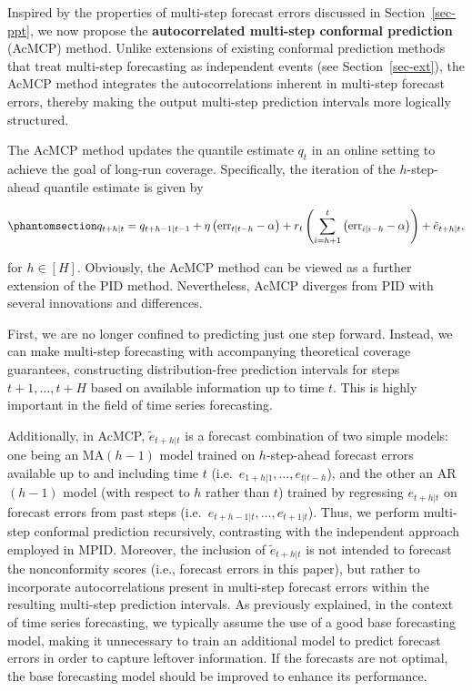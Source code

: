 \documentclass[
  11pt,
  a4paper,
]{article}
\theoremstyle{plain}
\theoremstyle{remark}
\begin{document}
Inspired by the properties of multi-step forecast errors discussed in
Section~\ref{sec-ppt}, we now propose the \textbf{autocorrelated
multi-step conformal prediction} (AcMCP) method. Unlike extensions of
existing conformal prediction methods that treat multi-step forecasting
as independent events (see Section~\ref{sec-ext}), the AcMCP method
integrates the autocorrelations inherent in multi-step forecast errors,
thereby making the output multi-step prediction intervals more logically
structured.

The AcMCP method updates the quantile estimate \(q_t\) in an online
setting to achieve the goal of long-run coverage. Specifically, the
iteration of the \(h\)-step-ahead quantile estimate is given by

\begin{equation}\phantomsection\label{eq-acmcp}{
q_{t+h|t}=q_{t+h-1|t-1}+\eta \left(\mathrm{err}_{t|t-h}-\alpha\right)+r_t\left(\sum_{i=h+1}^t \left(\mathrm{err}_{i|i-h}-\alpha\right)\right)+\tilde{e}_{t+h|t},
}\end{equation}

for \(h\in[H]\). Obviously, the AcMCP method can be viewed as a further
extension of the PID method. Nevertheless, AcMCP diverges from PID with
several innovations and differences.

First, we are no longer confined to predicting just one step forward.
Instead, we can make multi-step forecasting with accompanying
theoretical coverage guarantees, constructing distribution-free
prediction intervals for steps \(t+1,\ldots,t+H\) based on available
information up to time \(t\). This is highly important in the field of
time series forecasting.

Additionally, in AcMCP, \(\tilde{e}_{t+h|t}\) is a forecast combination
of two simple models: one being an MA\((h-1)\) model trained on
\(h\)-step-ahead forecast errors available up to and including time
\(t\) (i.e.~\(e_{1+h|1}, \ldots, e_{t|t-h}\)), and the other an
AR\((h-1)\) model (with respect to \(h\) rather than \(t\)) trained by
regressing \(e_{t+h|t}\) on forecast errors from past steps
(i.e.~\(e_{t+h-1|t}, \ldots, e_{t+1|t}\)). Thus, we perform multi-step
conformal prediction recursively, contrasting with the independent
approach employed in MPID. Moreover, the inclusion of
\(\tilde{e}_{t+h|t}\) is not intended to forecast the nonconformity
scores (i.e., forecast errors in this paper), but rather to incorporate
autocorrelations present in multi-step forecast errors within the
resulting multi-step prediction intervals. As previously explained, in
the context of time series forecasting, we typically assume the use of a
good base forecasting model, making it unnecessary to train an
additional model to predict forecast errors in order to capture leftover
information. If the forecasts are not optimal, the base forecasting
model should be improved to enhance its performance.
\end{document}
